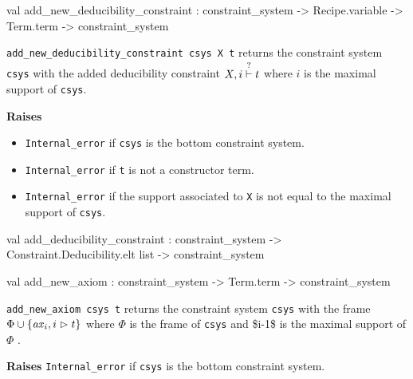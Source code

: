 \label{val:Constraint-underscoresystem.add-underscorenew-underscorededucibility-underscoreconstraint}\begin{ocamldoccode}
val add_new_deducibility_constraint :
  constraint_system ->
  Recipe.variable -> Term.term -> constraint_system
\end{ocamldoccode}
\begin{ocamldocdescription}
{\tt{add\_new\_deducibility\_constraint csys X t}} returns the constraint system {\tt{csys}} with the added deducibility constraint
    $X, i \stackrel{?}{\vdash} t$ where $i$  is the maximal support of {\tt{csys}}.

{\bf Raises} \begin{itemize}
\item {\tt{Internal\_error}} if {\tt{csys}} is the bottom constraint system.
\item {\tt{Internal\_error}} if {\tt{t}} is not a constructor term. \highdebug 
\item {\tt{Internal\_error}} if the support associated to {\tt{X}} is not equal to the maximal support of {\tt{csys}}.
\end{itemize}



\end{ocamldocdescription}




\label{val:Constraint-underscoresystem.add-underscorededucibility-underscoreconstraint}\begin{ocamldoccode}
val add_deducibility_constraint :
  constraint_system ->
  Constraint.Deducibility.elt list -> constraint_system
\end{ocamldoccode}




\label{val:Constraint-underscoresystem.add-underscorenew-underscoreaxiom}\begin{ocamldoccode}
val add_new_axiom : constraint_system ->
  Term.term -> constraint_system
\end{ocamldoccode}
\begin{ocamldocdescription}
{\tt{add\_new\_axiom csys t}} returns the constraint system {\tt{csys}} with the frame $\Phi \cup \{ \mathit{ax}_i, i \vartriangleright t\}$ 
    where $\Phi$  is the frame of {\tt{csys}} and \$i-1\$ is the maximal support of $\Phi$ .

{\bf Raises} {\tt{Internal\_error}} if {\tt{csys}} is the bottom constraint system.


\end{ocamldocdescription}




